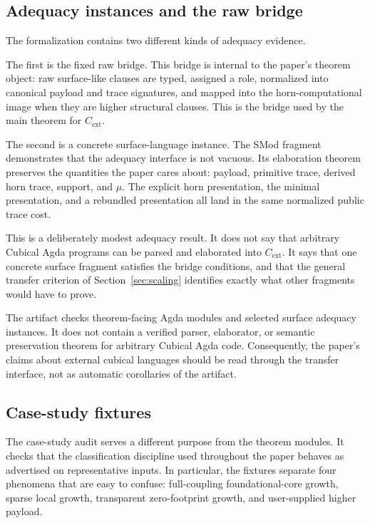 \subsection{Adequacy instances and the raw bridge}
\label{subsec:adequacy-instances-artifact}

The formalization contains two different kinds of adequacy evidence.

The first is the fixed raw bridge.  This bridge is internal to the paper's theorem object: raw
surface-like clauses are typed, assigned a role, normalized into canonical payload and trace
signatures, and mapped into the horn-computational image when they are higher structural
clauses.  This is the bridge used by the main theorem for \(C_{\mathrm{ext}}\).

The second is a concrete surface-language instance.  The SMod fragment demonstrates that the
adequacy interface is not vacuous.  Its elaboration theorem preserves the quantities the paper
cares about: payload, primitive trace, derived horn trace, support, and \(\mu\).  The explicit
horn presentation, the minimal presentation, and a rebundled presentation all land in the same
normalized public trace cost.

This is a deliberately modest adequacy result.  It does not say that arbitrary Cubical Agda
programs can be parsed and elaborated into \(C_{\mathrm{ext}}\).  It says that one concrete
surface fragment satisfies the bridge conditions, and that the general transfer criterion of
Section~\ref{sec:scaling} identifies exactly what other fragments would have to prove.

\begin{remark}
\label{rem:no-parser-theorem-cubical-agda}
The artifact checks theorem-facing Agda modules and selected surface adequacy instances.  It
does not contain a verified parser, elaborator, or semantic preservation theorem for arbitrary
Cubical Agda code.  Consequently, the paper's claims about external cubical languages should be
read through the transfer interface, not as automatic corollaries of the artifact.
\end{remark}

\subsection{Case-study fixtures}
\label{subsec:case-study-fixtures}

The case-study audit serves a different purpose from the theorem modules.  It checks that the
classification discipline used throughout the paper behaves as advertised on representative
inputs.  In particular, the fixtures separate four phenomena that are easy to confuse:
full-coupling foundational-core growth, sparse local growth, transparent zero-footprint growth,
and user-supplied higher payload.

